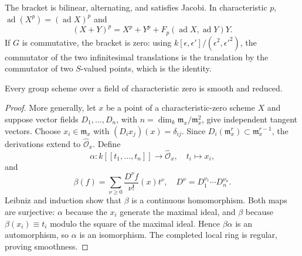 \begin{remark}
\label{mumford-rem-lie-identities}
The bracket is bilinear, alternating, and satisfies Jacobi. In characteristic
$p$, $\operatorname{ad}(X^p)=(\operatorname{ad}X)^p$ and
\[
(X+Y)^p=X^p+Y^p+F_p(\operatorname{ad}X,\operatorname{ad}Y)Y.
\]
If $G$ is commutative, the bracket is zero: using
$k[\epsilon,\epsilon']/ (\epsilon^2,\epsilon'^2)$, the commutator of the
two infinitesimal translations is the translation by the commutator of two
$S$-valued points, which is the identity.
\end{remark}

\begin{theorem}
\label{mumford-thm-abelian-smooth}
Every group scheme over a field of characteristic zero is smooth and reduced.
\end{theorem}
\begin{proof}
More generally, let $x$ be a point of a characteristic-zero scheme $X$ and
suppose vector fields $D_1,\ldots,D_n$, with
$n=\dim_k\mathfrak m_x/\mathfrak m_x^2$, give independent tangent vectors.
Choose $x_i\in\mathfrak m_x$ with $(D_ix_j)(x)=\delta_{ij}$. Since
$D_i(\mathfrak m_x^r)\subset\mathfrak m_x^{r-1}$, the derivations extend to
$\widehat{\mathcal O}_x$. Define
\[
\alpha:k[[t_1,\ldots,t_n]]\to\widehat{\mathcal O}_x,\quad t_i\mapsto x_i,
\]
and
\[
\beta(f)=\sum_{\nu\ge0}\frac{D^\nu f}{\nu!}(x)t^\nu,
\quad D^\nu=D_1^{\nu_1}\cdots D_n^{\nu_n}.
\]
Leibniz and induction show that $\beta$ is a continuous homomorphism.
Both maps are surjective: $\alpha$ because the $x_i$ generate the maximal
ideal, and $\beta$ because $\beta(x_i)\equiv t_i$ modulo the square of the
maximal ideal. Hence $\beta\alpha$ is an automorphism, so $\alpha$ is an
isomorphism. The completed local ring is regular, proving smoothness.
\end{proof}

